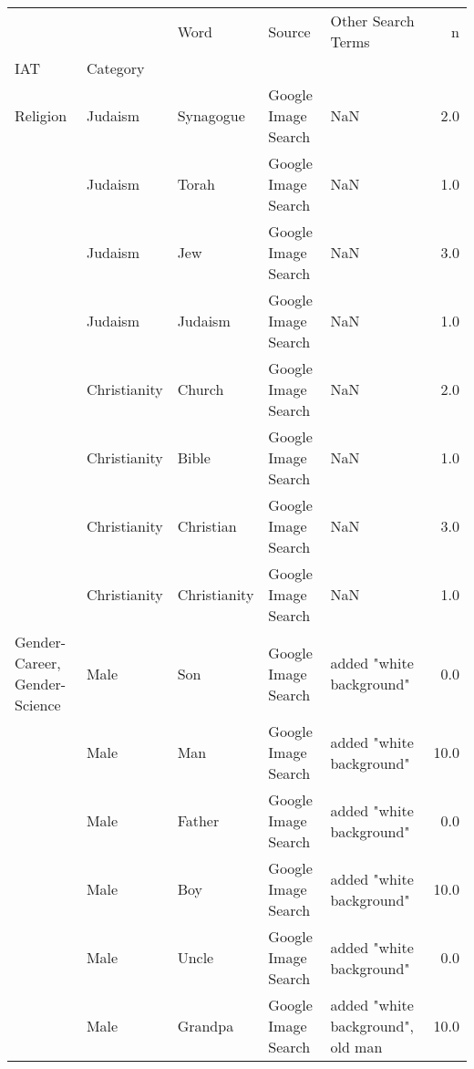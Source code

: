 \begin{tabular}{lllllr}
\toprule
          &      &             Word &               Source &                                 Other Search Terms &     n \\
IAT & Category &                  &                      &                                                    &       \\
\midrule
Religion & Judaism &        Synagogue &  Google Image Search &                                                NaN &   2.0 \\
          & Judaism &            Torah &  Google Image Search &                                                NaN &   1.0 \\
          & Judaism &              Jew &  Google Image Search &                                                NaN &   3.0 \\
          & Judaism &          Judaism &  Google Image Search &                                                NaN &   1.0 \\
          & Christianity &           Church &  Google Image Search &                                                NaN &   2.0 \\
          & Christianity &            Bible &  Google Image Search &                                                NaN &   1.0 \\
          & Christianity &        Christian &  Google Image Search &                                                NaN &   3.0 \\
          & Christianity &     Christianity &  Google Image Search &                                                NaN &   1.0 \\
Gender-Career, Gender-Science & Male &              Son &  Google Image Search &                           added "white background" &   0.0 \\
          & Male &              Man &  Google Image Search &                           added "white background" &  10.0 \\
          & Male &           Father &  Google Image Search &                           added "white background" &   0.0 \\
          & Male &              Boy &  Google Image Search &                           added "white background" &  10.0 \\
          & Male &            Uncle &  Google Image Search &                           added "white background" &   0.0 \\
          & Male &          Grandpa &  Google Image Search &                  added "white background", old man &  10.0 \\

\end{tabular}
